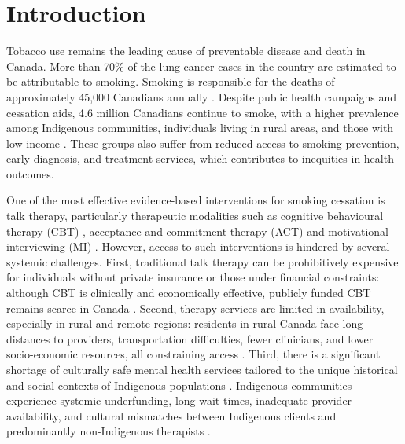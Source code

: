 \chapter{Introduction}


Tobacco use remains the leading cause of preventable disease and death in Canada. More than 70\% of the lung cancer cases in the country are estimated to be attributable to smoking. Smoking is responsible for the deaths of approximately 45,000 Canadians annually \citep{poirier2019estimates}. Despite public health campaigns and cessation aids, 4.6 million Canadians continue to smoke, with a higher prevalence among Indigenous communities, individuals living in rural areas, and those with low income \cite{cpac2020lung}. These groups also suffer from reduced access to smoking prevention, early diagnosis, and treatment services, which contributes to inequities in health outcomes.

One of the most effective evidence-based interventions for smoking cessation is talk therapy, particularly therapeutic modalities such as cognitive behavioural therapy (CBT) \cite{beck2011cognitive}, acceptance and commitment therapy (ACT) \cite{hayes1999acceptance} and motivational interviewing (MI) \cite{miller2012motivational}. However, access to such interventions is hindered by several systemic challenges. First, traditional talk therapy can be prohibitively expensive for individuals without private insurance or those under financial constraints: although CBT is clinically and economically effective, publicly funded CBT remains scarce in Canada \cite{llewellyn2017economic}. Second, therapy services are limited in availability, especially in rural and remote regions: residents in rural Canada face long distances to providers, transportation difficulties, fewer clinicians, and lower socio-economic resources, all constraining access \cite{crosato2011rural}. Third, there is a significant shortage of culturally safe mental health services tailored to the unique historical and social contexts of Indigenous populations \cite{jones2021mental}. Indigenous communities experience systemic underfunding, long wait times, inadequate provider availability, and cultural mismatches between Indigenous clients and predominantly non-Indigenous therapists \cite{firstnationshealth2023, turner2018poverty}.


